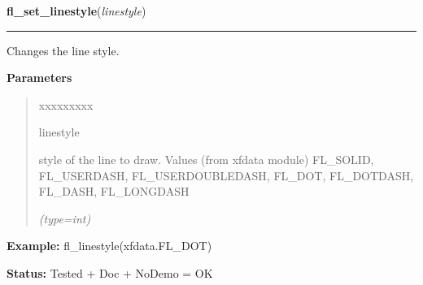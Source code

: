 \hspace{.8\funcindent}\begin{boxedminipage}{\funcwidth}

    \raggedright \textbf{fl\_set\_linestyle}(\textit{linestyle})

    \vspace{-1.5ex}

    \rule{\textwidth}{0.5\fboxrule}
\setlength{\parskip}{2ex}
    Changes the line style.

\setlength{\parskip}{1ex}
      \textbf{Parameters}
      \vspace{-1ex}

      \begin{quote}
        \begin{Ventry}{xxxxxxxxx}

          \item[linestyle]

          style of the line to draw. Values (from xfdata module) FL\_SOLID,
          FL\_USERDASH, FL\_USERDOUBLEDASH, FL\_DOT, FL\_DOTDASH, FL\_DASH,
          FL\_LONGDASH

            {\it (type=int)}

        \end{Ventry}

      \end{quote}

\textbf{Example:} fl\_linestyle(xfdata.FL\_DOT)



\textbf{Status:} Tested + Doc + NoDemo = OK



    \end{boxedminipage}

    \label{xformslib:flxbasic:fl_drawmode}

    \vspace{0.5ex}

